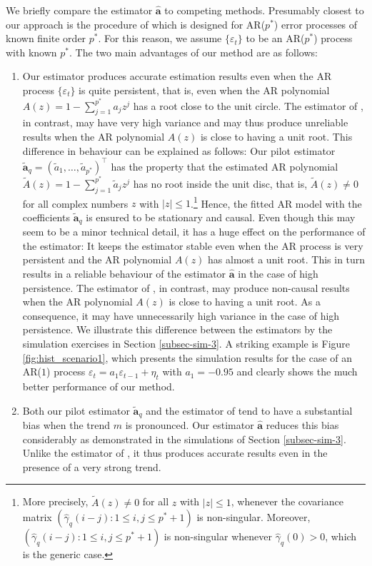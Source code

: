 We briefly compare the estimator $\widehat{\boldsymbol{a}}$ to competing methods. Presumably closest to our approach is the procedure of \cite{Hall2003} which is designed for AR($p^*$) error processes of known finite order $p^*$. For this reason, we assume $\{\varepsilon_t\}$ to be an AR($p^*$) process with known $p^*$. The two main advantages of our method are as follows: 
\begin{enumerate}[label=(\alph*),leftmargin=0.7cm]
\item Our estimator produces accurate estimation results even when the AR process $\{\varepsilon_t\}$ is quite persistent, that is, even when the AR polynomial $A(z) = 1 - \sum_{j=1}^{p^*} a_j z^j$ has a root close to the unit circle. The estimator of \cite{Hall2003}, in contrast, may have very high variance and may thus produce unreliable results when the AR polynomial $A(z)$ is close to having a unit root. This difference in behaviour can be explained as follows: Our pilot estimator $\widetilde{\boldsymbol{a}}_q = (\widetilde{a}_1,\ldots,\widetilde{a}_{p^*})^\top$ has the property that the estimated AR polynomial $\widetilde{A}(z) = 1 - \sum_{j=1}^{p^*} \widetilde{a}_j z^j$ has no root inside the unit disc, that is, $\widetilde{A}(z) \ne 0$ for all complex numbers $z$ with $|z| \le 1$.\footnote{More precisely, $\widetilde{A}(z) \ne 0$ for all $z$ with $|z| \le 1$, whenever the covariance matrix $(\widehat{\gamma}_q(i-j): 1 \le i,j \le p^*+1)$ is non-singular. Moreover, $(\widehat{\gamma}_q(i-j): 1 \le i,j \le p^*+1)$ is non-singular whenever $\widehat{\gamma}_q(0) > 0$, which is the generic case.} Hence, the fitted AR model with the coefficients $\widetilde{\boldsymbol{a}}_q$ is ensured to be stationary and causal. Even though this may seem to be a minor technical detail, it has a huge effect on the performance of the estimator: It keeps the estimator stable even when the AR process is very persistent and the AR polynomial $A(z)$ has almost a unit root. This in turn results in a reliable behaviour of the estimator $\widehat{\boldsymbol{a}}$ in the case of high persistence. The estimator of \cite{Hall2003}, in contrast, may produce non-causal results when the AR polynomial $A(z)$ is close to having a unit root. As a consequence, it may have unnecessarily high variance in the case of high persistence. We illustrate this difference between the estimators by the simulation exercises in Section \ref{subsec-sim-3}. A striking example is Figure \ref{fig:hist_scenario1}, which presents the simulation results for the case of an AR($1$) process $\varepsilon_t = a_1 \varepsilon_{t-1} + \eta_t$ with $a_1 = -0.95$ and clearly shows the much better performance of our method.  
\item Both our pilot estimator $\widetilde{\boldsymbol{a}}_q$ and the estimator of \cite{Hall2003} tend to have a substantial bias when the trend $m$ is pronounced. Our estimator $\widehat{\boldsymbol{a}}$ reduces this bias considerably as demonstrated in the simulations of Section \ref{subsec-sim-3}. Unlike the estimator of \cite{Hall2003}, it thus produces accurate results even in the presence of a very strong trend. 
\end{enumerate}


